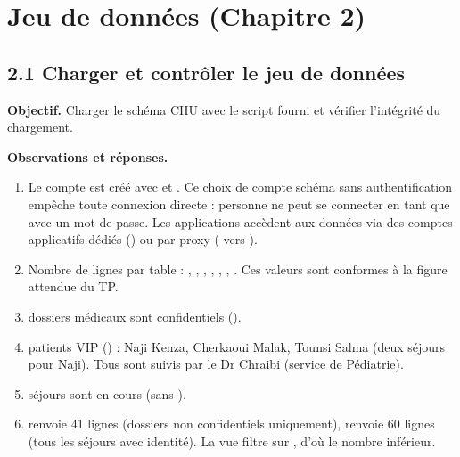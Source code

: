 \section{Jeu de données (Chapitre 2)}

\subsection{2.1 Charger et contrôler le jeu de données}
\textbf{Objectif.} Charger le schéma CHU avec le script fourni et vérifier l'intégrité du chargement.


\textbf{Observations et réponses.}
\begin{enumerate}
  \item Le compte  est créé avec  et . Ce choix de compte schéma sans authentification empêche toute connexion directe : personne ne peut se connecter en tant que  avec un mot de passe. Les applications accèdent aux données via des comptes applicatifs dédiés () ou par proxy ( vers ).
  \item Nombre de lignes par table : , , , , , , . Ces valeurs sont conformes à la figure attendue du TP.
  \item {} dossiers médicaux sont confidentiels ().
  \item {} patients VIP () : Naji Kenza, Cherkaoui Malak, Tounsi Salma (deux séjours pour Naji). Tous sont suivis par le Dr Chraibi (service de Pédiatrie).
  \item {} séjours sont en cours (sans ).
  \item {} renvoie 41 lignes (dossiers non confidentiels uniquement),  renvoie 60 lignes (tous les séjours avec identité). La vue  filtre sur , d'où le nombre inférieur.
\end{enumerate}
